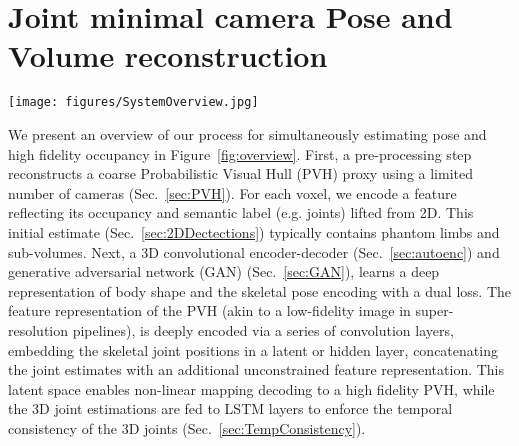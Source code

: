 \documentclass{bmvc2k}
\newcommand{\squeezeup}{\vspace{-2mm}}
\begin{document}
\section{Joint minimal camera Pose and Volume reconstruction}
\begin{figure*}[t!]
\centering
\texttt{[image: figures/SystemOverview.jpg]}
   \caption{Network architecture. The input is a low fidelity geometric proxy ($V_L$) from two wide baseline camera views. This proxy is passed through a decoder-encoder to produce a 3D human pose estimate (joint angles $J(V_L)$) via the latent space and to output, a high-fidelity geometric proxy ($V_H$) regularised via discriminator (D).\label{fig:overview}
}
\end{figure*}
We present an overview of our process for simultaneously estimating pose and high fidelity occupancy in Figure~\ref{fig:overview}.  First, a pre-processing step~\cite{Grauman2003} reconstructs a coarse Probabilistic Visual Hull (PVH) proxy using a limited number of cameras (Sec.~\ref{sec:PVH}).  For each voxel, we encode a feature reflecting its occupancy and semantic label (e.g. joints) lifted from 2D.  This initial estimate (Sec.~\ref{sec:2DDectections}) typically contains phantom limbs and sub-volumes. Next, a 3D convolutional encoder-decoder (Sec.~\ref{sec:autoenc}) and generative adversarial network (GAN) (Sec.~\ref{sec:GAN}), learns a deep representation of body shape and the skeletal pose encoding with a dual loss. The feature representation of the PVH (akin to a low-fidelity image in super-resolution pipelines), is deeply encoded via a series of convolution layers, embedding the skeletal joint positions in a latent or hidden layer, concatenating the joint estimates with an additional unconstrained feature representation. This latent space enables non-linear mapping decoding to a high fidelity PVH, while the 3D joint estimations are fed to LSTM layers to enforce the temporal consistency of the 3D joints (Sec.~\ref{sec:TempConsistency}). 
\squeezeup
\squeezeup
\end{document}
